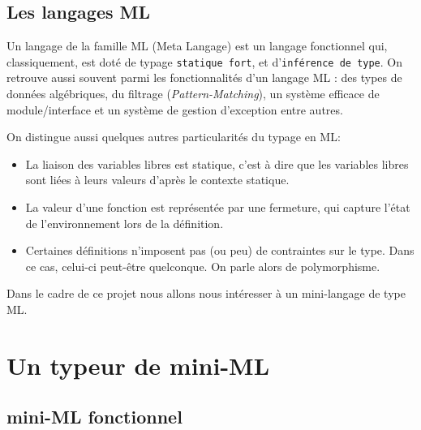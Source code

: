 \documentclass[a4paper, 11pt]{article}
\begin{document}
\subsection {Les langages ML}
Un langage de la famille ML (Meta Langage) est un langage fonctionnel qui, classiquement, est doté de typage \texttt{statique fort}, et d'\texttt{inférence de type}.
On retrouve aussi souvent parmi les fonctionnalités d'un langage ML : des types de données algébriques, du filtrage (\emph{Pattern-Matching}), un système efficace de module/interface et un système de gestion d'exception entre autres.

On distingue aussi quelques autres particularités du typage en ML: 
\begin{itemize}
\item La liaison des variables libres est statique, c'est à dire que les variables libres sont liées à leurs valeurs d'après le contexte statique. 
\item La valeur d'une fonction est représentée par une fermeture, qui capture l'état de l'environnement lors de la définition.
\item Certaines définitions n'imposent pas (ou peu) de contraintes sur le type. Dans ce cas, celui-ci peut-être quelconque. On parle alors de polymorphisme.
\end{itemize}

Dans le cadre de ce projet nous allons nous intéresser à un mini-langage de type ML.

\section{Un typeur de mini-ML}

\subsection{mini-ML fonctionnel}
\end{document}
